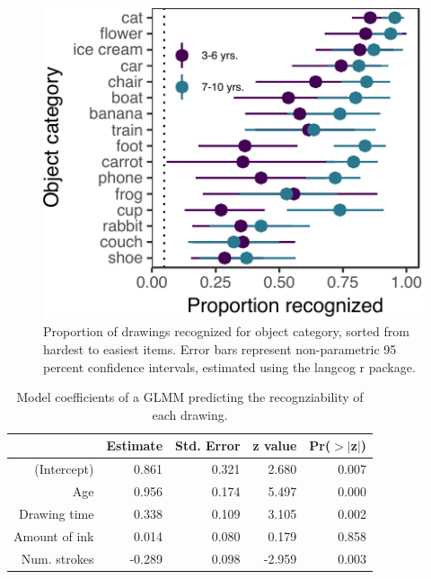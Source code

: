 \documentclass[10pt, letterpaper]{article}
\newenvironment{CodeChunk}{}{}
\begin{document}
\begin{CodeChunk}
\begin{figure}[H]

{\centering \includegraphics{figs/recognizabilityByItem-1} 

}

\caption[Proportion of drawings recognized for object category, sorted from hardest to easiest items]{Proportion of drawings recognized for object category, sorted from hardest to easiest items. Error bars represent non-parametric 95 percent confidence intervals, estimated using the langcog r package.}\label{fig:recognizabilityByItem}
\end{figure}
\end{CodeChunk}

\begin{table}[H]
\centering
\begin{tabular}{rrrrr}
  \hline
 & Estimate & Std. Error & z value & Pr($>$$|$z$|$) \\ 
  \hline
(Intercept) & 0.861 & 0.321 & 2.680 & 0.007 \\ 
  Age & 0.956 & 0.174 & 5.497 & 0.000 \\ 
  Drawing time & 0.338 & 0.109 & 3.105 & 0.002 \\ 
  Amount of ink & 0.014 & 0.080 & 0.179 & 0.858 \\ 
  Num. strokes & -0.289 & 0.098 & -2.959 & 0.003 \\ 
   \hline
\end{tabular}
\caption{Model coefficients of a GLMM predicting the recognziability of each  drawing.} 
\end{table}
\end{document}
